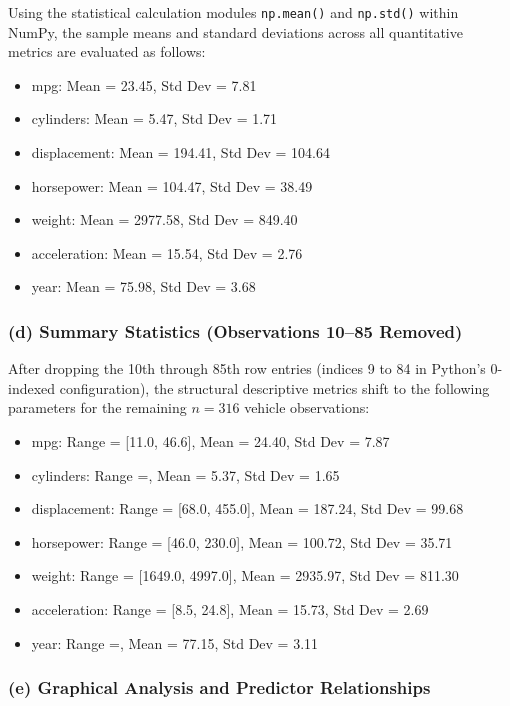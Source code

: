 \documentclass[12pt,a4paper]{article}
\begin{document}
Using the statistical calculation modules \texttt{np.mean()} and \texttt{np.std()} within NumPy, the sample means and standard deviations across all quantitative metrics are evaluated as follows:

\begin{itemize}
\item mpg: Mean = 23.45, Std Dev = 7.81
\item cylinders: Mean = 5.47, Std Dev = 1.71
\item displacement: Mean = 194.41, Std Dev = 104.64
\item horsepower: Mean = 104.47, Std Dev = 38.49
\item weight: Mean = 2977.58, Std Dev = 849.40
\item acceleration: Mean = 15.54, Std Dev = 2.76
\item year: Mean = 75.98, Std Dev = 3.68
\end{itemize}

\subsubsection*{(d) Summary Statistics (Observations 10--85 Removed)}

After dropping the 10th through 85th row entries (indices 9 to 84 in Python's 0-indexed configuration), the structural descriptive metrics shift to the following parameters for the remaining $n=316$ vehicle observations:

\begin{itemize}
\item mpg: Range = [11.0, 46.6], Mean = 24.40, Std Dev = 7.87
\item cylinders: Range =, Mean = 5.37, Std Dev = 1.65
\item displacement: Range = [68.0, 455.0], Mean = 187.24, Std Dev = 99.68
\item horsepower: Range = [46.0, 230.0], Mean = 100.72, Std Dev = 35.71
\item weight: Range = [1649.0, 4997.0], Mean = 2935.97, Std Dev = 811.30
\item acceleration: Range = [8.5, 24.8], Mean = 15.73, Std Dev = 2.69
\item year: Range =, Mean = 77.15, Std Dev = 3.11
\end{itemize}

\subsubsection*{(e) Graphical Analysis and Predictor Relationships}
\end{document}
